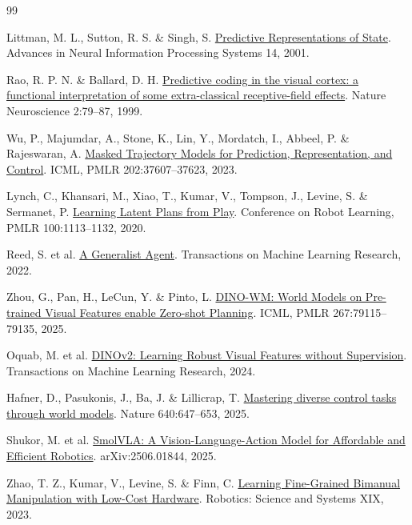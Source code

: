 \documentclass[11pt]{article}
\begin{document}
\FloatBarrier\begin{thebibliography}{99}

 Littman, M. L., Sutton, R. S. \& Singh, S. \href{https://proceedings.neurips.cc/paper/2001/hash/1e4d36177d71bbb3558e43af9577d70e-Abstract.html}{Predictive Representations of State}. Advances in Neural Information Processing Systems 14, 2001.

 Rao, R. P. N. \& Ballard, D. H. \href{https://www.nature.com/articles/nn0199_79}{Predictive coding in the visual cortex: a functional interpretation of some extra-classical receptive-field effects}. Nature Neuroscience 2:79--87, 1999.

 Wu, P., Majumdar, A., Stone, K., Lin, Y., Mordatch, I., Abbeel, P. \& Rajeswaran, A. \href{https://proceedings.mlr.press/v202/wu23o.html}{Masked Trajectory Models for Prediction, Representation, and Control}. ICML, PMLR 202:37607--37623, 2023.

 Lynch, C., Khansari, M., Xiao, T., Kumar, V., Tompson, J., Levine, S. \& Sermanet, P. \href{https://proceedings.mlr.press/v100/lynch20a.html}{Learning Latent Plans from Play}. Conference on Robot Learning, PMLR 100:1113--1132, 2020.

 Reed, S. et al. \href{https://arxiv.org/abs/2205.06175}{A Generalist Agent}. Transactions on Machine Learning Research, 2022.

 Zhou, G., Pan, H., LeCun, Y. \& Pinto, L. \href{https://proceedings.mlr.press/v267/zhou25t.html}{DINO-WM: World Models on Pre-trained Visual Features enable Zero-shot Planning}. ICML, PMLR 267:79115--79135, 2025.

 Oquab, M. et al. \href{https://arxiv.org/abs/2304.07193}{DINOv2: Learning Robust Visual Features without Supervision}. Transactions on Machine Learning Research, 2024.

 Hafner, D., Pasukonis, J., Ba, J. \& Lillicrap, T. \href{https://doi.org/10.1038/s41586-025-08744-2}{Mastering diverse control tasks through world models}. Nature 640:647--653, 2025.

 Shukor, M. et al. \href{https://arxiv.org/abs/2506.01844}{SmolVLA: A Vision-Language-Action Model for Affordable and Efficient Robotics}. arXiv:2506.01844, 2025.

 Zhao, T. Z., Kumar, V., Levine, S. \& Finn, C. \href{https://roboticsproceedings.org/rss19/p016.html}{Learning Fine-Grained Bimanual Manipulation with Low-Cost Hardware}. Robotics: Science and Systems XIX, 2023.


\end{thebibliography}
\end{document}

